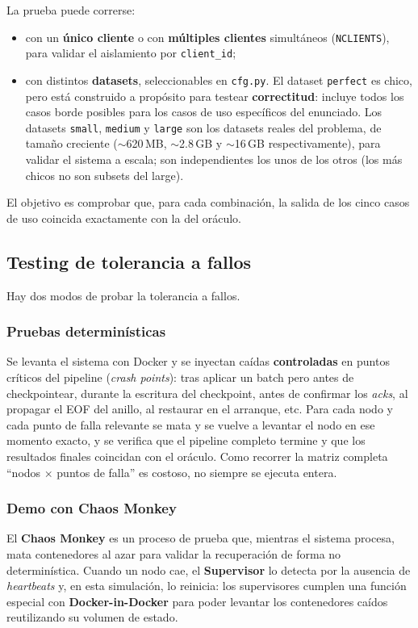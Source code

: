 \documentclass[12pt,a4paper]{article}
\begin{document}
La prueba puede correrse:
\begin{itemize}
    \item con un \textbf{único cliente} o con \textbf{múltiples clientes}
        simultáneos (\texttt{NCLIENTS}), para validar el aislamiento por
        \texttt{client\_id};
    \item con distintos \textbf{datasets}, seleccionables en \texttt{cfg.py}. El
        dataset \texttt{perfect} es chico, pero está construido a propósito para
        testear \textbf{correctitud}: incluye todos los casos borde
        posibles para
        los casos de uso específicos del enunciado. Los datasets \texttt{small},
        \texttt{medium} y \texttt{large} son los datasets reales del
        problema, de
        tamaño creciente ($\sim$620\,MB, $\sim$2.8\,GB y $\sim$16\,GB
        respectivamente), para validar el sistema a escala;
        son independientes los unos de los otros (los más chicos no
        son subsets del large).
\end{itemize}
El objetivo es comprobar que, para cada combinación, la salida de los cinco
casos de uso coincida exactamente con la del oráculo.

\subsection{Testing de tolerancia a fallos}
Hay dos modos de probar la tolerancia a fallos.

\subsubsection{Pruebas determinísticas}
Se levanta el sistema con Docker y se inyectan caídas \textbf{controladas} en
puntos críticos del pipeline (\textit{crash points}): tras aplicar un batch pero
antes de checkpointear, durante la escritura del checkpoint, antes de
confirmar los \textit{acks}, al propagar el EOF del anillo, al restaurar en el
arranque, etc. Para cada nodo y cada punto de falla relevante se mata y se
vuelve a levantar el nodo en ese momento exacto, y se verifica que el pipeline
completo termine y que los resultados finales coincidan con el oráculo. Como
recorrer la matriz completa ``nodos $\times$ puntos de falla'' es costoso, no
siempre se ejecuta entera.

\subsubsection{Demo con Chaos Monkey}
El \textbf{Chaos Monkey} es un proceso de prueba que, mientras el sistema
procesa, mata contenedores al azar para validar la recuperación de forma no
determinística. Cuando un nodo cae, el \textbf{Supervisor} lo detecta por la
ausencia de \textit{heartbeats} y, en esta simulación, lo reinicia: los
supervisores cumplen una función especial con \textbf{Docker-in-Docker} para
poder levantar los contenedores caídos reutilizando su volumen de estado.
\end{document}
